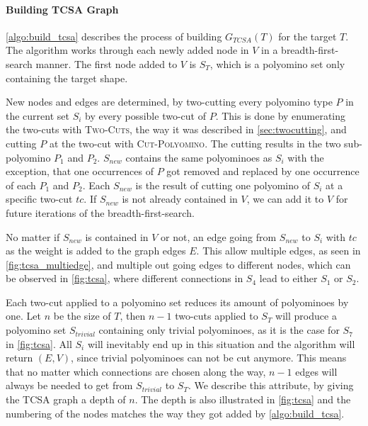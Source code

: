 \paragraph{Building TCSA Graph}

\autoref{algo:build_tcsa} describes the process of building $G_{TCSA}(T)$ for the target $T$.
The algorithm works through each newly added node in $V$ in a breadth-first-search manner.
The first node added to $V$ is $S_T$, which is a polyomino set only containing the target shape.

New nodes and edges are determined, by two-cutting every polyomino type $P$ in the current set $S_i$ by every possible two-cut of $P$.
This is done by enumerating the two-cuts with {\scshape Two-Cuts}, the way it was described in \autoref{sec:twocutting}, and cutting $P$ at the two-cut with {\scshape Cut-Polyomino}.
The cutting results in the two sub-polyomino $P_1$ and $P_2$.
$S_{new}$ contains the same polyominoes as $S_i$ with the exception, that one occurrences of $P$ got removed and replaced by one occurrence of each $P_1$ and $P_2$.
Each $S_{new}$ is the result of cutting one polyomino of $S_i$ at a specific two-cut $tc$.
If $S_{new}$ is not already contained in $V$, we can add it to $V$ for future iterations of the breadth-first-search.

No matter if $S_{new}$ is contained in $V$ or not, an edge going from $S_{new}$ to $S_i$ with $tc$ as the weight is added to the graph edges $E$.
This allow multiple edges, as seen in \autoref{fig:tcsa_multiedge}, and multiple out going edges to different nodes, which can be observed in \autoref{fig:tcsa}, where different connections in $S_4$ lead to either $S_1$ or $S_2$.

Each two-cut applied to a polyomino set reduces its amount of polyominoes by one.
Let $n$ be the size of $T$, then $n-1$ two-cuts applied to $S_T$ will produce a polyomino set $S_{trivial}$ containing only trivial polyominoes, as it is the case for $S_7$ in \autoref{fig:tcsa}.
All $S_i$ will inevitably end up in this situation and the algorithm will return $(E,V)$, since trivial polyominoes can not be cut anymore.
This means that no matter which connections are chosen along the way, $n-1$ edges will always be needed to get from $S_{trivial}$ to $S_T$.
We describe this attribute, by giving the TCSA graph a depth of $n$.
The depth is also illustrated in \autoref{fig:tcsa} and the numbering of the nodes matches the way they got added by \autoref{algo:build_tcsa}.

